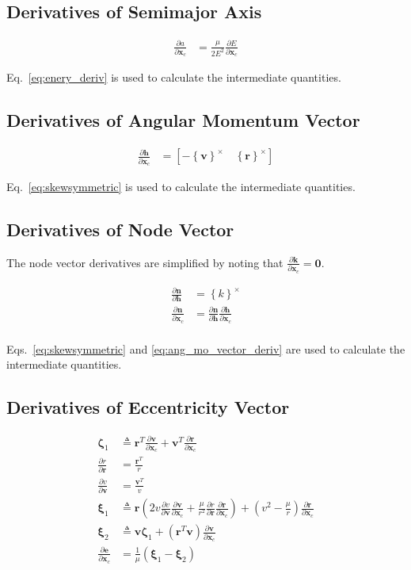 \documentclass[]{article}
\newcommand{\vb}[1]{\bm{#1}} %
\newcommand{\pd}[2]{\frac{\partial #1}{\partial #2}} %
\newcommand{\crossmat}[1]{\left\{ {#1} \right\}^{\times}} %
\newcommand{\xc}[0]{\vb{x}_c}
\begin{document}
\subsection{Derivatives of Semimajor Axis}

\begin{align}
\pd{a}{\xc} &= \frac{\mu}{2 E^2} \pd{E}{\xc}
\end{align}

\noindent Eq.~\eqref{eq:enery_deriv} is used to calculate the intermediate quantities.

\subsection{Derivatives of Angular Momentum Vector}

\begin{align}
\label{eq:ang_mo_vector_deriv}
\pd{\vb{h}}{\xc} &= \left[ -\crossmat{\vb{v}} \quad \crossmat{\vb{r}} \right]
\end{align}

\noindent Eq.~\eqref{eq:skewsymmetric} is used to calculate the intermediate quantities.

\subsection{Derivatives of Node Vector}

The node vector derivatives are simplified by noting that $\pd{\vb{k}}{\xc} = \vb{0}$.

\begin{align}
\label{eq:node_vector_deriv}
\pd{\vb{n}}{\vb{h}} &= \crossmat{k} \\
\pd{\vb{n}}{\xc} &= \pd{\vb{n}}{\vb{h}} \pd{\vb{h}}{\xc} \\
\end{align}

\noindent Eqs.~\eqref{eq:skewsymmetric} and \eqref{eq:ang_mo_vector_deriv} are used to calculate the intermediate quantities.

\subsection{Derivatives of Eccentricity Vector}

\begin{align}
\vb{\zeta}_1 &\triangleq \vb{r}^T \pd{\vb{v}}{\xc} + \vb{v}^T \pd{\vb{r}}{\xc} \\
\pd{r}{\vb{r}} &= \frac{\vb{r}^T}{r} \\
\pd{v}{\vb{v}} &= \frac{\vb{v}^T}{v} \\
\vb{\xi}_1 &\triangleq \vb{r} \left( 2 v \pd{v}{\vb{v}} \pd{\vb{v}}{\xc} + \frac{\mu}{r^2} \pd{r}{\vb{r}} \pd{\vb{r}}{\xc} \right) + \left( v^2 - \frac{\mu}{r} \right) \pd{\vb{r}}{\xc} \\
\vb{\xi}_2 &\triangleq \vb{v} \vb{\zeta}_1 + \left( \vb{r}^T \vb{v} \right) \pd{\vb{v}}{\xc}  \\
\label{eq:ecc_vector_deriv}
\pd{\vb{e}}{\xc} &= \frac{1}{\mu} \left( \vb{\xi}_1 - \vb{\xi}_2 \right)
\end{align}
\end{document}
